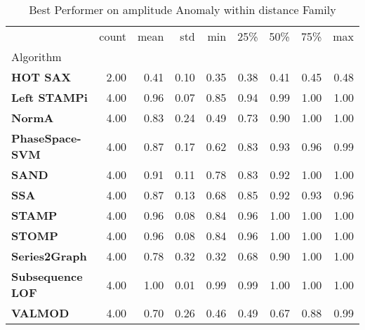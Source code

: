 \begin{table}
\caption{Best Performer on amplitude Anomaly within distance Family}
\label{tab:bp-amplitude_distance}
\begin{tabular}{lrrrrrrrr}
\toprule
 & count & mean & std & min & 25\% & 50\% & 75\% & max \\
Algorithm &  &  &  &  &  &  &  &  \\
\midrule
\textbf{HOT SAX} & 2.00 & 0.41 & 0.10 & 0.35 & 0.38 & 0.41 & 0.45 & 0.48 \\
\textbf{Left STAMPi} & 4.00 & 0.96 & 0.07 & 0.85 & 0.94 & 0.99 & 1.00 & 1.00 \\
\textbf{NormA} & 4.00 & 0.83 & 0.24 & 0.49 & 0.73 & 0.90 & 1.00 & 1.00 \\
\textbf{PhaseSpace-SVM} & 4.00 & 0.87 & 0.17 & 0.62 & 0.83 & 0.93 & 0.96 & 0.99 \\
\textbf{SAND} & 4.00 & 0.91 & 0.11 & 0.78 & 0.83 & 0.92 & 1.00 & 1.00 \\
\textbf{SSA} & 4.00 & 0.87 & 0.13 & 0.68 & 0.85 & 0.92 & 0.93 & 0.96 \\
\textbf{STAMP} & 4.00 & 0.96 & 0.08 & 0.84 & 0.96 & 1.00 & 1.00 & 1.00 \\
\textbf{STOMP} & 4.00 & 0.96 & 0.08 & 0.84 & 0.96 & 1.00 & 1.00 & 1.00 \\
\textbf{Series2Graph} & 4.00 & 0.78 & 0.32 & 0.32 & 0.68 & 0.90 & 1.00 & 1.00 \\
\textbf{Subsequence LOF} & 4.00 & 1.00 & 0.01 & 0.99 & 0.99 & 1.00 & 1.00 & 1.00 \\
\textbf{VALMOD} & 4.00 & 0.70 & 0.26 & 0.46 & 0.49 & 0.67 & 0.88 & 0.99 \\
\bottomrule
\end{tabular}
\end{table}

